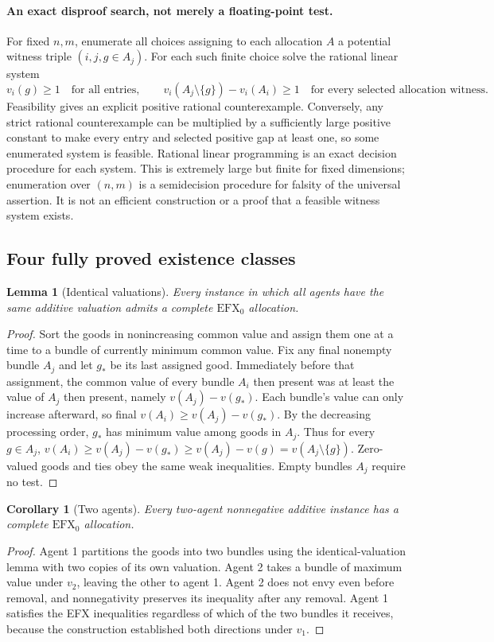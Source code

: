 \documentclass[11pt,a4paper]{article}
\newtheorem{lemma}[theorem]{Lemma}
\newtheorem{corollary}[theorem]{Corollary}
\theoremstyle{definition}
\theoremstyle{remark}
\begin{document}
\paragraph{An exact disproof search, not merely a floating-point test.}
For fixed $n,m$, enumerate all choices assigning to each allocation $A$ a potential witness triple $(i,j,g\in A_j)$. For each such finite choice solve the rational linear system
\[
 v_i(g)\geq1\quad\text{for all entries},\qquad
 v_i(A_j\setminus\{g\})-v_i(A_i)\geq1
       \quad\text{for every selected allocation witness}.
\]
Feasibility gives an explicit positive rational counterexample. Conversely, any strict rational counterexample can be multiplied by a sufficiently large positive constant to make every entry and selected positive gap at least one, so some enumerated system is feasible. Rational linear programming is an exact decision procedure for each system. This is extremely large but finite for fixed dimensions; enumeration over $(n,m)$ is a semidecision procedure for falsity of the universal assertion. It is not an efficient construction or a proof that a feasible witness system exists.

\subsection{Four fully proved existence classes}
\begin{lemma}[Identical valuations]
Every instance in which all agents have the same additive valuation admits a complete $\mathrm{EFX}_0$ allocation.
\end{lemma}
\begin{proof}
Sort the goods in nonincreasing common value and assign them one at a time to a bundle of currently minimum common value. Fix any final nonempty bundle $A_j$ and let $g_*$ be its last assigned good. Immediately before that assignment, the common value of every bundle $A_i$ then present was at least the value of $A_j$ then present, namely $v(A_j)-v(g_*)$. Each bundle's value can only increase afterward, so final $v(A_i)\geq v(A_j)-v(g_*)$. By the decreasing processing order, $g_*$ has minimum value among goods in $A_j$. Thus for every $g\in A_j$,
$v(A_i)\geq v(A_j)-v(g_*)\geq v(A_j)-v(g)=v(A_j\setminus\{g\})$.
Zero-valued goods and ties obey the same weak inequalities. Empty bundles $A_j$ require no test.
\end{proof}

\begin{corollary}[Two agents]
Every two-agent nonnegative additive instance has a complete $\mathrm{EFX}_0$ allocation.
\end{corollary}
\begin{proof}
Agent 1 partitions the goods into two bundles using the identical-valuation lemma with two copies of its own valuation. Agent 2 takes a bundle of maximum value under $v_2$, leaving the other to agent 1. Agent 2 does not envy even before removal, and nonnegativity preserves its inequality after any removal. Agent 1 satisfies the EFX inequalities regardless of which of the two bundles it receives, because the construction established both directions under $v_1$.
\end{proof}
\end{document}
